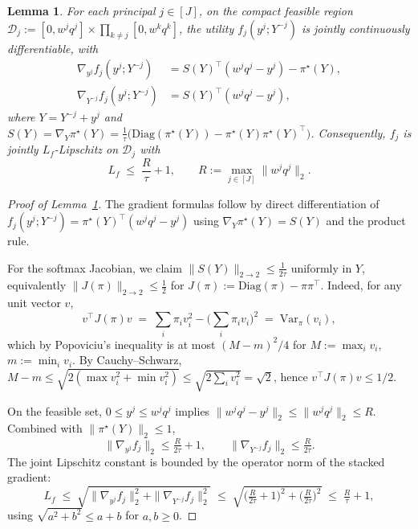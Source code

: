 \documentclass{article}
\newtheorem{lemma}{Lemma}
\begin{document}
\begin{lemma}\label{lem:utility-lipschitz}
For each principal $j\in[J]$, on the compact feasible region
$\mathcal{D}_j := [0,w^j q^j] \times \prod_{k\neq j}[0, w^k q^k]$,
the utility $f_j(y^j;Y^{-j})$ is jointly continuously differentiable, with
\begin{align*}
\nabla_{y^j} f_j(y^j;Y^{-j}) 
  &= S(Y)^\top(w^j q^j - y^j) - \pi^\star(Y),\\
\nabla_{Y^{-j}} f_j(y^j;Y^{-j}) 
  &= S(Y)^\top(w^j q^j - y^j),
\end{align*}
where $Y=Y^{-j}+y^j$ and $S(Y)=\nabla_Y\pi^\star(Y)
=\frac{1}{\tau}\bigl(\mathrm{Diag}(\pi^\star(Y))-\pi^\star(Y)\pi^\star(Y)^\top\bigr)$.
Consequently, $f_j$ is jointly $L_f$-Lipschitz on $\mathcal{D}_j$ with
\begin{equation}\label{eq:Lf-explicit}
L_f \;\le\; \frac{R}{\tau}+1,
\qquad R := \max_{j\in[J]} \|w^j q^j\|_2.
\end{equation}
\end{lemma}

\begin{proof}[Proof of Lemma~\ref{lem:utility-lipschitz}]
The gradient formulas follow by direct differentiation of
$f_j(y^j;Y^{-j})=\pi^\star(Y)^\top(w^j q^j - y^j)$ using
$\nabla_Y \pi^\star(Y)=S(Y)$ and the product rule.

For the softmax Jacobian, we claim $\|S(Y)\|_{2\to 2}\le \tfrac{1}{2\tau}$ uniformly in $Y$, equivalently $\|J(\pi)\|_{2\to 2}\le \tfrac12$ for $J(\pi):=\mathrm{Diag}(\pi)-\pi\pi^\top$. Indeed, for any unit vector $v$,
\[
v^\top J(\pi) v
\;=\;
\sum_i \pi_i v_i^2 - \Big(\sum_i \pi_i v_i\Big)^{\!2}
\;=\;
\mathrm{Var}_\pi(v_i),
\]
which by Popoviciu's inequality is at most $(M-m)^2/4$ for $M:=\max_i v_i$, $m:=\min_i v_i$. By Cauchy--Schwarz, $M-m \le \sqrt{2(\max v_i^2+\min v_i^2)}\le \sqrt{2\sum_i v_i^2}=\sqrt 2$, hence $v^\top J(\pi)v\le 1/2$.

On the feasible set, $0\le y^j\le w^j q^j$ implies
$\|w^j q^j - y^j\|_2 \le \|w^j q^j\|_2 \le R$. Combined with $\|\pi^\star(Y)\|_2\le 1$,
\[
\|\nabla_{y^j} f_j\|_2 \le \tfrac{R}{2\tau}+1,
\qquad
\|\nabla_{Y^{-j}} f_j\|_2 \le \tfrac{R}{2\tau}.
\]
The joint Lipschitz constant is bounded by the operator norm of the stacked gradient:
\[
L_f \;\le\; \sqrt{\|\nabla_{y^j}f_j\|_2^2 + \|\nabla_{Y^{-j}}f_j\|_2^2}
\;\le\; \sqrt{\big(\tfrac{R}{2\tau}+1\big)^2 + \big(\tfrac{R}{2\tau}\big)^2}
\;\le\; \tfrac{R}{\tau}+1,
\]
using $\sqrt{a^2+b^2}\le a+b$ for $a,b\ge 0$.
\end{proof}
\end{document}
